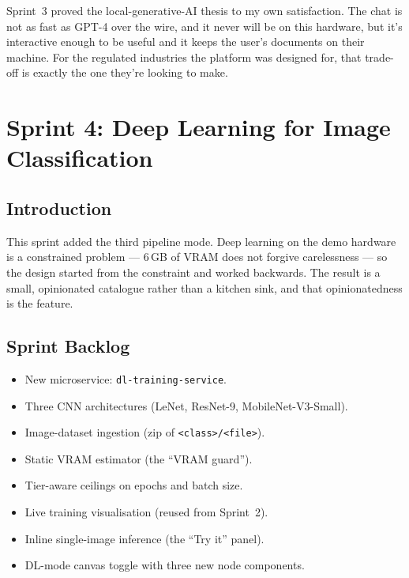 \documentclass[12pt, a4paper]{report}
\begin{document}
Sprint~3 proved the local-generative-AI thesis to my own
satisfaction. The chat is not as fast as GPT-4 over the wire, and it
never will be on this hardware, but it's interactive enough to be
useful and it keeps the user's documents on their machine. For the
regulated industries the platform was designed for, that trade-off
is exactly the one they're looking to make.

\chapter{Sprint 4: Deep Learning for Image Classification}

\section*{Introduction}

This sprint added the third pipeline mode. Deep learning on the
demo hardware is a constrained problem --- 6\,GB of VRAM does not
forgive carelessness --- so the design started from the constraint
and worked backwards. The result is a small, opinionated catalogue
rather than a kitchen sink, and that opinionatedness is the feature.

\section{Sprint Backlog}

\begin{itemize}
    \item New microservice: \texttt{dl-training-service}.
    \item Three CNN architectures (LeNet, ResNet-9, MobileNet-V3-Small).
    \item Image-dataset ingestion (zip of \texttt{<class>/<file>}).
    \item Static VRAM estimator (the ``VRAM guard'').
    \item Tier-aware ceilings on epochs and batch size.
    \item Live training visualisation (reused from Sprint~2).
    \item Inline single-image inference (the ``Try it'' panel).
    \item DL-mode canvas toggle with three new node components.
\end{itemize}
\end{document}
